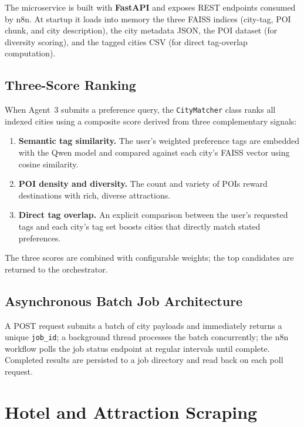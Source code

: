 \documentclass[12pt,a4paper]{report}
\begin{document}
The microservice is built with \textbf{FastAPI} and exposes REST endpoints consumed by n8n. At
startup it loads into memory the three FAISS indices (city-tag, POI chunk, and city description),
the city metadata JSON, the POI dataset (for diversity scoring), and the tagged cities CSV (for
direct tag-overlap computation).

\subsection{Three-Score Ranking}

When Agent~3 submits a preference query, the \texttt{CityMatcher} class ranks all indexed cities
using a composite score derived from three complementary signals:

\begin{enumerate}
    \item \textbf{Semantic tag similarity.} The user's weighted preference tags are embedded with
          the Qwen model and compared against each city's FAISS vector using cosine similarity.
    \item \textbf{POI density and diversity.} The count and variety of POIs reward destinations
          with rich, diverse attractions.
    \item \textbf{Direct tag overlap.} An explicit comparison between the user's requested tags
          and each city's tag set boosts cities that directly match stated preferences.
\end{enumerate}

The three scores are combined with configurable weights; the top candidates are returned to the
orchestrator.

\subsection{Asynchronous Batch Job Architecture}

A POST request submits a batch of city payloads and immediately returns a unique \texttt{job\_id};
a background thread processes the batch concurrently; the n8n workflow polls the job status endpoint
at regular intervals until complete. Completed results are persisted to a job directory and read back
on each poll request.

\section{Hotel and Attraction Scraping}
\end{document}
